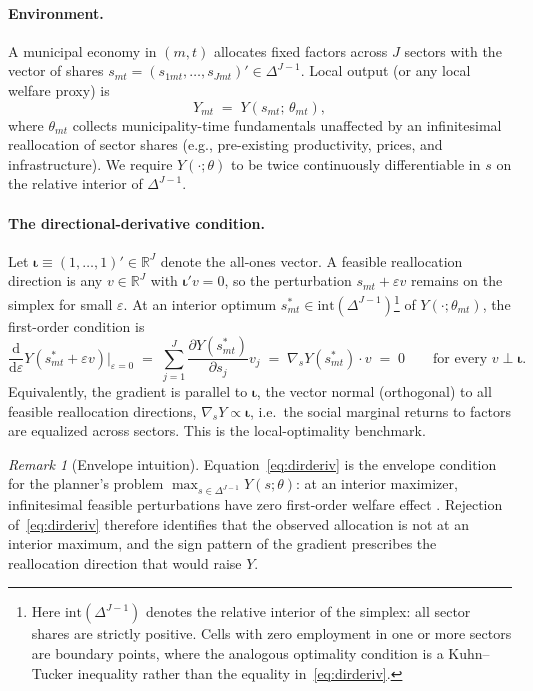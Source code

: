\documentclass{article}
\newcommand{\iotaVec}{\boldsymbol{\iota}}
\theoremstyle{plain}
\theoremstyle{definition}
\theoremstyle{remark}
\newtheorem{remark}{Remark}
\begin{document}
\paragraph{Environment.}
A municipal economy in $(m,t)$ allocates fixed factors across $J$ sectors with
the vector of shares $s_{mt} = (s_{1mt},\dots,s_{Jmt})' \in\Delta^{J-1}$.
Local output (or any local welfare proxy) is
\[
  Y_{mt} \;=\; Y\!\left(s_{mt};\,\theta_{mt}\right),
\]
where $\theta_{mt}$ collects municipality-time fundamentals
unaffected by an infinitesimal reallocation of sector shares (e.g.,
pre-existing productivity, prices, and infrastructure). We require $Y(\cdot;\theta)$ to be twice continuously
differentiable in $s$ on the relative interior of $\Delta^{J-1}$.

\paragraph{The directional-derivative condition.}
Let $\iotaVec\equiv(1,\dots,1)'\in\mathbb{R}^{J}$ denote the all-ones vector. A feasible reallocation direction is any $v\in\mathbb{R}^J$ with
$\iotaVec'v=0$, so the perturbation $s_{mt}+\varepsilon v$ remains on the
simplex for small $\varepsilon$. At an interior optimum $s^{*}_{mt}\in
\mathrm{int}(\Delta^{J-1})$\footnote{Here $\mathrm{int}(\Delta^{J-1})$ denotes
the relative interior of the simplex: all sector shares are strictly positive.
Cells with zero employment in one or more sectors are boundary points, where
the analogous optimality condition is a Kuhn--Tucker inequality rather than
the equality in~\eqref{eq:dirderiv}.} of $Y(\cdot;\theta_{mt})$, the first-order
condition is
\begin{equation}\label{eq:dirderiv}
  \frac{\mathrm{d}}{\mathrm{d}\varepsilon} Y\!\left(s^{*}_{mt}+\varepsilon v\right)
  \bigg|_{\varepsilon=0}
  \;=\;
  \sum_{j=1}^{J}
  \frac{\partial Y(s^*_{mt})}{\partial s_j} v_j
  \;=\;
  \nabla_{s} Y(s^{*}_{mt})\cdot v
  \;=\;
  0
  \qquad\text{for every } v\perp \iotaVec.
\end{equation}
Equivalently, the gradient is parallel to $\iotaVec$, the vector normal
(orthogonal) to all feasible reallocation directions, $\nabla_{s}Y\propto
\iotaVec$, i.e.\ the social marginal returns to factors are equalized across
sectors. This is the
local-optimality benchmark.

\begin{remark}[Envelope intuition]
Equation~\eqref{eq:dirderiv} is the envelope condition for the planner's
problem $\max_{s\in\Delta^{J-1}} Y(s;\theta)$: at an interior maximizer,
infinitesimal feasible perturbations have zero first-order welfare effect
\citep{samuelson1947foundations}. Rejection of~\eqref{eq:dirderiv} therefore
identifies that the observed allocation is not at an interior maximum, and
the sign pattern of the gradient prescribes the reallocation direction that
would raise $Y$.
\end{remark}
\end{document}
